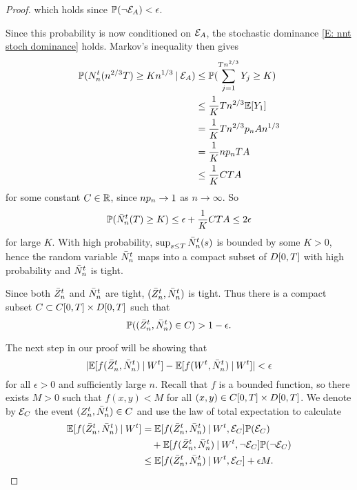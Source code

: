 \begin{proof}
which holds since $\mathbb{P}(\neg\mathcal{E}_{A}) <\epsilon$.

Since this probability is now conditioned on $\mathcal{E}_{A}$, the stochastic dominance \eqref{E: nnt stoch dominance} holds.
Markov's inequality then gives
\begin{align*}
\mathbb{P}(N_n^t(n^{2 / 3}T) \geq Kn^{1 / 3} \: | \: \mathcal{E}_{A}) 
&\leq \mathbb{P}( \sum_{j=1}^{Tn^{2 / 3}} Y_j \geq K) \\
&\leq \frac{1}{K}Tn^{2 / 3} \mathbb{E}[Y_1] \\
&= \frac{1}{K}Tn^{2 / 3} p_n An^{1 / 3} \\
&= \frac{1}{K}np_n TA \\
&\leq \frac{1}{K}CTA
\end{align*}
for some constant $C \in \mathbb{R}$, since $np_n \rightarrow 1$ as $n \rightarrow \infty$.
So
\begin{equation}
\mathbb{P}(\bar{N}_n^t(T) \geq K) \leq \epsilon + \frac{1}{K}CTA \leq 2 \epsilon
\end{equation}
for large $K$.
With high probability, $\sup_{s \leq T}\bar{N}_n^t(s)$ is bounded by some $K>0$,
hence the random variable $\bar{N}_n^t$ maps into a compact subset of $D[0, T]$ with high probability and $\bar{N}_n^t$ is tight.

Since both $\bar{Z}^t_n$ and $\bar{N}_n^t$ are tight, $(\bar{Z}^t_n, \bar{N}_n^t)$ is tight.
Thus there is a compact subset $C \subset C[0, T] \times D[0, T]$ such that
\begin{equation}
	\mathbb{P}( (\bar{Z}^t_n, \bar{N}_n^t) \in C) > 1 - \epsilon.
\end{equation}

The next step in our proof will be showing that
\begin{equation}
|\mathbb{E}[ f(\bar{Z}^t_n, \bar{N}_n^t) \: | \: W^t] - \mathbb{E}[f(W^t, \bar{N}_n^t) \: | \: W^t]| < \epsilon
\end{equation}
for all $\epsilon>0$ and sufficiently large $n$.
Recall that $f$ is a bounded function, so there exists $M>0$ such that $f(x,y) < M$ for all $(x,y) \in C[0, T] \times D[0, T]$.
We denote by $\mathcal{E}_{C}$ the event $(Z_n^t, \bar{N}_n^t) \in C$ and use the law of total expectation to calculate
\begin{equation} \label{E: Estimation step 1}
\begin{aligned}
\mathbb{E}[ f(\bar{Z}^t_n, \bar{N}_n^t) \: | \: W^t] 
&= \mathbb{E}[f(\bar{Z}^t_n, \bar{N}_n^t) \: | \: W^t, \mathcal{E}_{C}] \mathbb{P}(\mathcal{E}_{C}) \\
&\quad + \mathbb{E}[f(\bar{Z}^t_n, \bar{N}_n^t) \: | \: W^t, \neg\mathcal{E}_{C}] \mathbb{P}(\neg\mathcal{E}_{C}) \\
&\leq \mathbb{E}[f(\bar{Z}^t_n, \bar{N}_n^t) \: | \: W^t, \mathcal{E}_{C}] + \epsilon M.
\end{aligned}
\end{equation}


\end{proof}
